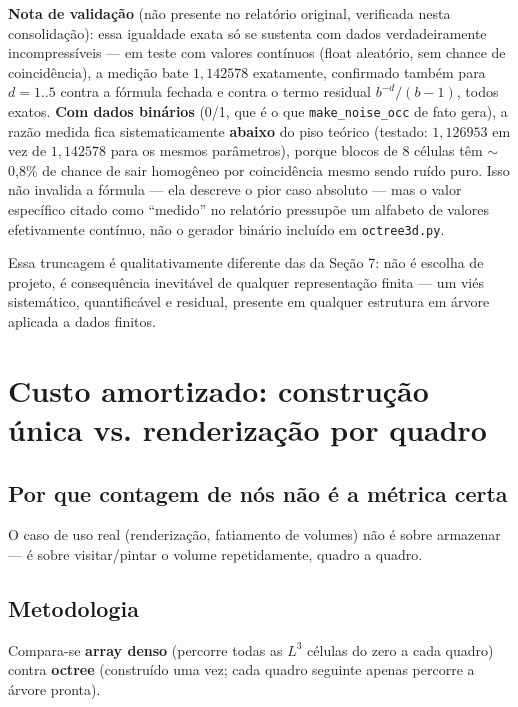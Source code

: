 \documentclass[11pt,a4paper]{article}
\begin{document}
\textbf{Nota de validação} (não presente no relatório original, verificada nesta consolidação): essa igualdade exata só se sustenta com dados verdadeiramente incompressíveis --- em teste com valores contínuos (float aleatório, sem chance de coincidência), a medição bate $1{,}142578$ exatamente, confirmado também para $d=1..5$ contra a fórmula fechada e contra o termo residual $b^{-d}/(b-1)$, todos exatos. \textbf{Com dados binários} (0/1, que é o que \texttt{make\_noise\_occ} de fato gera), a razão medida fica sistematicamente \textbf{abaixo} do piso teórico (testado: $1{,}126953$ em vez de $1{,}142578$ para os mesmos parâmetros), porque blocos de 8 células têm $\sim$0,8\% de chance de sair homogêneo por coincidência mesmo sendo ruído puro. Isso não invalida a fórmula --- ela descreve o pior caso absoluto --- mas o valor específico citado como ``medido'' no relatório pressupõe um alfabeto de valores efetivamente contínuo, não o gerador binário incluído em \texttt{octree3d.py}.

Essa truncagem é qualitativamente diferente das da Seção 7: não é escolha de projeto, é consequência inevitável de qualquer representação finita --- um viés sistemático, quantificável e residual, presente em qualquer estrutura em árvore aplicada a dados finitos.

\section{Custo amortizado: construção única vs. renderização por quadro}

\subsection{Por que contagem de nós não é a métrica certa}

O caso de uso real (renderização, fatiamento de volumes) não é sobre armazenar --- é sobre visitar/pintar o volume repetidamente, quadro a quadro.

\subsection{Metodologia}

Compara-se \textbf{array denso} (percorre todas as $L^3$ células do zero a cada quadro) contra \textbf{octree} (construído uma vez; cada quadro seguinte apenas percorre a árvore pronta).
\end{document}
